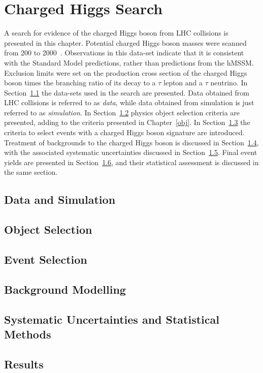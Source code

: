 \chapter{Charged Higgs Search}
\label{chargedH}
\begin{chapabstract}
A search for evidence of the charged Higgs boson from LHC collisions is 
presented in this chapter. Potential charged Higgs boson masses were scanned from 200 
to 2000~\GeV. Observations in this data-set indicate that it is consistent with the Standard 
Model predictions, rather than predictions from the hMSSM. Exclusion limits were 
set on the production cross section of the charged 
Higgs boson times the branching ratio of its decay to a $\tau$ lepton and a $\tau$ neutrino.  
In Section~\ref{sec:samplesCh} the data-sets used in the search are presented. Data obtained from 
LHC collisions is referred to as {\it data}, while data obtained from simulation is just referred to 
as {\it simulation}. In Section~\ref{sec:objCh} physics object selection criteria are presented, adding to the 
 criteria presented in Chapter~\ref{obj}. In Section~\ref{sec:evSelCh} the 
criteria to select events with a charged Higgs boson 
signature are introduced. Treatment of backgrounds to the charged Higgs boson is discussed in 
Section~\ref{sec:bkgCh}, with the associated systematic uncertainties discussed in Section~\ref{sec:systsCh}. 
Final event yields are presented in Section~\ref{sec:resCh}, and their statistical assessment is 
discussed in the same section.
\end{chapabstract}

\section{Data and Simulation}
\label{sec:samplesCh}


\section{Object Selection}
\label{sec:objCh}


\section{Event Selection}
\label{sec:evSelCh}


\section{Background Modelling}
\label{sec:bkgCh}


\section{Systematic Uncertainties and Statistical Methods}
\label{sec:systsCh}


\section{Results}
\label{sec:resCh}

